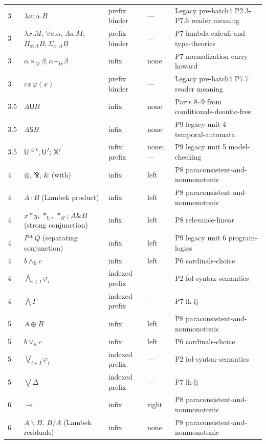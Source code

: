 \begin{longtable}{@{}p{}p{}p{}p{}p{}@{}}
3 & \(\lambda x{:}\alpha.B\) & prefix binder & --- & Legacy pre-batch4 P2.3-P7.6 reader meaning \\
3 & \(\lambda x.M\); \(\forall a.\alpha\), \(\Lambda a.M\); \(\Pi_{x:A}B,\Sigma_{x:A}B\) & prefix binder & --- & P7 lambda-calculi-and-type-theories \\
3 & \(\alpha\mathbin{\times_{\mathrm{ty}}}\beta,\alpha\mathbin{+_{\mathrm{ty}}}\beta\) & infix & none & P7 normalization-curry-howard \\
3 & \(\varepsilon x\,\varphi(x)\) & prefix binder & --- & Legacy pre-batch4 P7.7 reader meaning \\
3.5 & \(A\mathbin{\mathsf U}B\) & infix & none & Parts 8--9 from conditionals-deontic-free \\
3.5 & \(A\mathbin{\mathsf S}B\) & infix & none & P9 legacy unit 4 temporal-automata \\
3.5 & \(\mathsf U^{\leq k},\mathsf U^{I}\); \(\mathsf X^{I}\) & infix; prefix & none; --- & P9 legacy unit 5 model-checking \\
4 & \(\otimes\), \(\bindnasrepma\), \(\mathbin{\&}\) (with) & infix & left & P8 paraconsistent-and-nonmonotonic \\
4 & \(A\mathbin{\cdot}B\) (Lambek product) & infix & left & P8 paraconsistent-and-nonmonotonic \\
4 & \(x\ast y\), \(\ast_{\text{\L}}\), \(\ast_{\Pi}\); \(A\mathbin{\&}B\) (strong conjunction) & infix & left & P8 relevance-linear \\
4 & \(P*Q\) (separating conjunction) & infix & left & P9 legacy unit 6 program-logics \\
4 & \(b\wedge_{\mathbb B}c\) & infix & left & P6 cardinals-choice \\
4 & \(\bigwedge_{i\in I}\varphi_i\) & indexed prefix & --- & P2 fol-syntax-semantics \\
4 & \(\bigwedge\Gamma\) & indexed prefix & --- & P7 lk-lj \\
5 & \(A\oplus B\) & infix & left & P8 paraconsistent-and-nonmonotonic \\
5 & \(b\vee_{\mathbb B}c\) & infix & left & P6 cardinals-choice \\
5 & \(\bigvee_{i\in I}\varphi_i\) & indexed prefix & --- & P2 fol-syntax-semantics \\
5 & \(\bigvee\Delta\) & indexed prefix & --- & P7 lk-lj \\
6 & \(\multimap\) & infix & right & P8 paraconsistent-and-nonmonotonic \\
6 & \(A\backslash B,\ B/A\) (Lambek residuals) & infix & none & P8 paraconsistent-and-nonmonotonic \\

\end{longtable}
